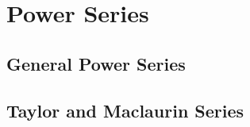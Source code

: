 \section{Power Series}





\subsection{General Power Series}


\subsection{Taylor and Maclaurin Series}

